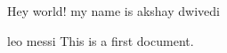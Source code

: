\documentclass{article}
\begin{document}
Hey world!
my name is akshay dwivedi 

leo messi
This is a first document.
\end{document}
